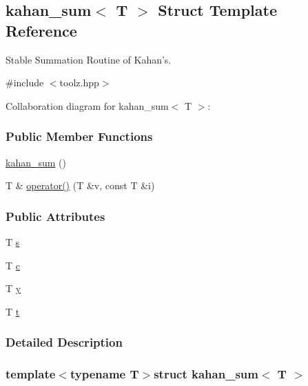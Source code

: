 \hypertarget{structkahan__sum}{\subsection{kahan\-\_\-sum$<$ \-T $>$ \-Struct \-Template \-Reference}
\label{structkahan__sum}
}


\-Stable \-Summation \-Routine of \-Kahan's.  




{\ttfamily \#include $<$toolz.\-hpp$>$}



\-Collaboration diagram for kahan\-\_\-sum$<$ \-T $>$\-:
\subsubsection*{\-Public \-Member \-Functions}
\begin{DoxyCompactItemize}
\item 
\hyperlink{structkahan__sum_a52d524cbd59987d8ed5ca2911119dcfe}{kahan\-\_\-sum} ()
\item 
\-T \& \hyperlink{structkahan__sum_a65ae305aabfbc3764c2732c8242b788d}{operator()} (\-T \&v, const \-T \&i)
\end{DoxyCompactItemize}
\subsubsection*{\-Public \-Attributes}
\begin{DoxyCompactItemize}
\item 
\-T \hyperlink{structkahan__sum_ae1b273e1cd734166b0840102e0392c3f}{s}
\item 
\-T \hyperlink{structkahan__sum_afab4196ad7b7070a3419edf6a22ed38c}{c}
\item 
\-T \hyperlink{structkahan__sum_a68f0ab79ede9b3e1e6d08279ef5b0086}{y}
\item 
\-T \hyperlink{structkahan__sum_a5a398ccf917c6235b89762261c7bdb77}{t}
\end{DoxyCompactItemize}


\subsubsection{\-Detailed \-Description}
\subsubsection*{template$<$typename T$>$struct kahan\-\_\-sum$<$ T $>$}

